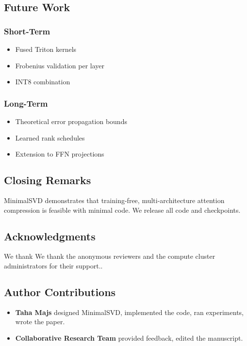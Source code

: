 \subsection{Future Work}

\subsubsection{Short-Term}
\begin{itemize}
\item Fused Triton kernels
\item Frobenius validation per layer
\item INT8 combination

\end{itemize}
\subsubsection{Long-Term}
\begin{itemize}
\item Theoretical error propagation bounds
\item Learned rank schedules
\item Extension to FFN projections

\end{itemize}
\subsection{Closing Remarks}

MinimalSVD demonstrates that training-free, multi-architecture attention 
compression is feasible with minimal code. We release all code and 
checkpoints.

\subsection{Acknowledgments}

We thank We thank the anonymous reviewers and the compute cluster administrators for their support..

\subsection{Author Contributions}

\begin{itemize}
\item \textbf{Taha Majs} designed MinimalSVD, implemented the code, ran experiments,
  wrote the paper.
\item \textbf{Collaborative Research Team} provided feedback, edited the manuscript.

\end{itemize}
